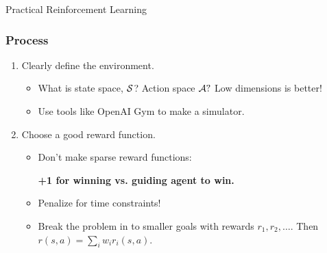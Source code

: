 
\begin{frame}
	\center\huge{Practical Reinforcement Learning}
\end{frame}

\begin{frame}
\frametitle{Process}
\begin{enumerate}
	\item Clearly define the environment.
	\begin{itemize}
		\item What is state space, ${\mathcal S}$? Action space ${\mathcal A}?$ Low dimensions is better!
		\item Use tools like OpenAI Gym to make a simulator.
	\end{itemize}
	\item Choose a good reward function.
	\begin{itemize}
		\item Don't make sparse reward functions: \\
		\begin{center}
			\textbf{+1 for winning vs. guiding agent to win.}
		\end{center}
		\item Penalize for time constraints!
		\item Break the problem in to smaller goals with rewards $r_1, r_2,\dots$. Then
			$r(s,a) = \sum_i w_i r_i(s,a)$.
	\end{itemize}
\end{enumerate}
\end{frame}


